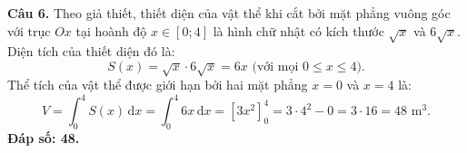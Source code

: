 \documentclass[12pt,a4paper]{article}
\begin{document}
\vspace{0.3cm}
\noindent\textbf{Câu 6.} Theo giả thiết, thiết diện của vật thể khi cắt bởi mặt phẳng vuông góc với trục $Ox$ tại hoành độ $x \in [0; 4]$ là hình chữ nhật có kích thước $\sqrt{x}$ và $6\sqrt{x}$.\\
Diện tích của thiết diện đó là:
\[
S(x) = \sqrt{x} \cdot 6\sqrt{x} = 6x\text{ (với mọi } 0 \le x \le 4\text{)}.
\]
Thể tích của vật thể được giới hạn bởi hai mặt phẳng $x = 0$ và $x = 4$ là:
\[
V = \int_0^4 S(x)\,\text{d}x = \int_0^4 6x\,\text{d}x = \left[ 3x^2 \right]_0^4 = 3 \cdot 4^2 - 0 = 3 \cdot 16 = 48\text{ m}^3.
\]
\textbf{Đáp số: 48.}
\end{document}
